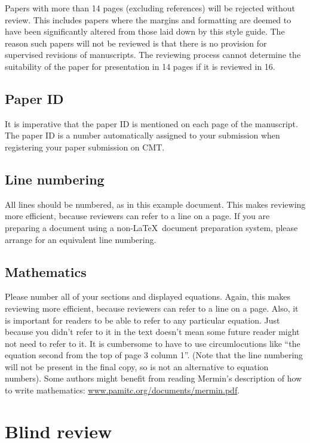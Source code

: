 \documentclass[runningheads]{llncs}
\begin{document}
Papers with more than 14 pages (excluding references) will be rejected without review.
This includes papers where the margins and
formatting are deemed to have been significantly altered from those
laid down by this style guide.  The reason such papers will not be
reviewed is that there is no provision for supervised revisions of
manuscripts. The reviewing process cannot determine the suitability of
the paper for presentation in 14 pages if it is reviewed in 16.

\subsection{Paper ID}

It is imperative that the paper ID is mentioned on each page of the manuscript.
The paper ID is a number automatically assigned to your submission when 
registering your paper submission on CMT.


\subsection{Line numbering}

All lines should be numbered, as in this example document.  This makes
reviewing more efficient, because reviewers can refer to a line on a
page.  If you are preparing a document using a non-\LaTeX\
document preparation system, please arrange for an equivalent line numbering.



\subsection{Mathematics}

Please number all of your sections and displayed equations.  Again,
this makes reviewing more efficient, because reviewers can refer to a
line on a page.  Also, it is important for readers to be able to refer
to any particular equation.  Just because you didn't refer to it in
the text doesn't mean some future reader might not need to refer to
it.  It is cumbersome to have to use circumlocutions like ``the
equation second from the top of page 3 column 1''.  (Note that the
line numbering will not be present in the final copy, so is not an
alternative to equation numbers).  Some authors might benefit from
reading Mermin's description of how to write mathematics:
\url{www.pamitc.org/documents/mermin.pdf‎}.

\section{Blind review}
\label{sec:blind}
\end{document}
